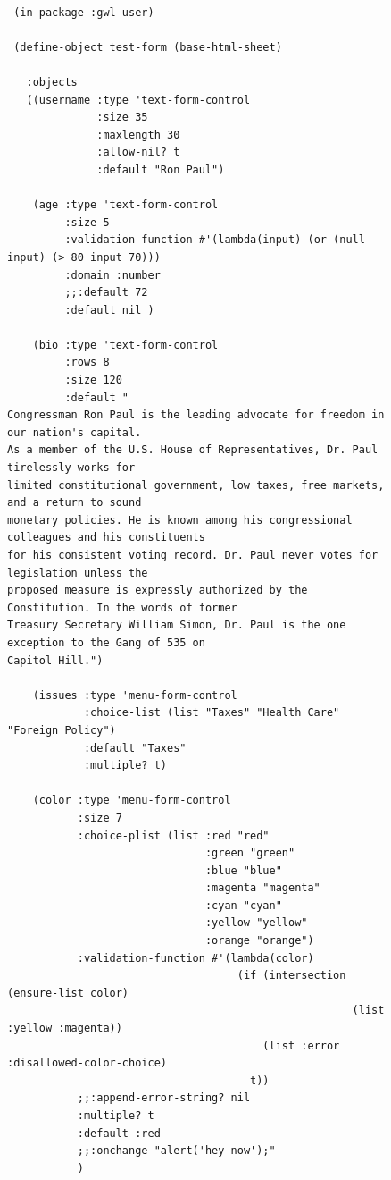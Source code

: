 \documentclass [11pt]{book}
\begin{document}
\begin{itemize}
\begin{description}
\end{description}




\begin{figure}
\begin{lrbox}{\boxedverb}
\begin{minipage}{\linewidth}
{\small

\begin{verbatim}

 (in-package :gwl-user)

 (define-object test-form (base-html-sheet)
  
   :objects
   ((username :type 'text-form-control
              :size 35
              :maxlength 30
              :allow-nil? t
              :default "Ron Paul")
   
    (age :type 'text-form-control
         :size 5
         :validation-function #'(lambda(input) (or (null input) (> 80 input 70)))
         :domain :number
         ;;:default 72
         :default nil )
   
    (bio :type 'text-form-control
         :rows 8
         :size 120
         :default "
Congressman Ron Paul is the leading advocate for freedom in our nation's capital. 
As a member of the U.S. House of Representatives, Dr. Paul tirelessly works for 
limited constitutional government, low taxes, free markets, and a return to sound 
monetary policies. He is known among his congressional colleagues and his constituents 
for his consistent voting record. Dr. Paul never votes for legislation unless the 
proposed measure is expressly authorized by the Constitution. In the words of former 
Treasury Secretary William Simon, Dr. Paul is the one exception to the Gang of 535 on 
Capitol Hill.")
   
    (issues :type 'menu-form-control
            :choice-list (list "Taxes" "Health Care" "Foreign Policy")
            :default "Taxes"
            :multiple? t)
   
    (color :type 'menu-form-control
           :size 7
           :choice-plist (list :red "red" 
                               :green "green" 
                               :blue "blue" 
                               :magenta "magenta" 
                               :cyan "cyan" 
                               :yellow "yellow" 
                               :orange "orange")
           :validation-function #'(lambda(color)
                                    (if (intersection (ensure-list color) 
                                                      (list :yellow :magenta))
                                        (list :error :disallowed-color-choice)
                                      t))
           ;;:append-error-string? nil
           :multiple? t
           :default :red
           ;;:onchange "alert('hey now');" 
           )
   

\end{verbatim}}
\end{minipage}
\end{lrbox}
\end{figure}
\end{itemize}
\end{document}

